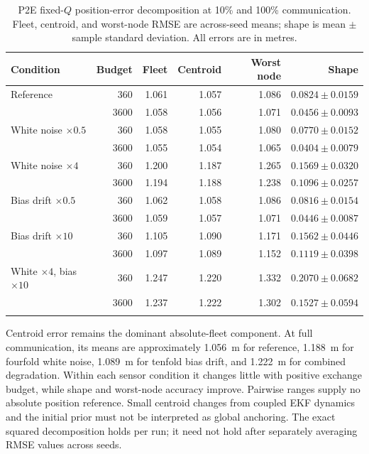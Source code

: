 \begin{table}[htbp]
\centering\small
\setlength{\tabcolsep}{4pt}
\caption{P2E fixed-\(Q\) position-error decomposition at 10\% and 100\% communication. Fleet, centroid, and worst-node RMSE are across-seed means; shape is mean \(\pm\) sample standard deviation. All errors are in metres.}
\label{tab:p2e_decomposition}
\begin{tabular}{lrrrrr}
\toprule
Condition & Budget & Fleet & Centroid & Worst node & Shape \\
\midrule
Reference & 360 & 1.061 & 1.057 & 1.086 & \(0.0824\pm0.0159\) \\
 & 3600 & 1.058 & 1.056 & 1.071 & \(0.0456\pm0.0093\) \\
\addlinespace
White noise $\times0.5$ & 360 & 1.058 & 1.055 & 1.080 & \(0.0770\pm0.0152\) \\
 & 3600 & 1.055 & 1.054 & 1.065 & \(0.0404\pm0.0079\) \\
\addlinespace
White noise $\times4$ & 360 & 1.200 & 1.187 & 1.265 & \(0.1569\pm0.0320\) \\
 & 3600 & 1.194 & 1.188 & 1.238 & \(0.1096\pm0.0257\) \\
\addlinespace
Bias drift $\times0.5$ & 360 & 1.062 & 1.058 & 1.086 & \(0.0816\pm0.0154\) \\
 & 3600 & 1.059 & 1.057 & 1.071 & \(0.0446\pm0.0087\) \\
\addlinespace
Bias drift $\times10$ & 360 & 1.105 & 1.090 & 1.171 & \(0.1562\pm0.0446\) \\
 & 3600 & 1.097 & 1.089 & 1.152 & \(0.1119\pm0.0398\) \\
\addlinespace
White $\times4$, bias $\times10$ & 360 & 1.247 & 1.220 & 1.332 & \(0.2070\pm0.0682\) \\
 & 3600 & 1.237 & 1.222 & 1.302 & \(0.1527\pm0.0594\) \\
\addlinespace
\bottomrule
\end{tabular}
\end{table}

Centroid error remains the dominant absolute-fleet component. At full communication, its means are approximately \SI{1.056}{m} for reference, \SI{1.188}{m} for fourfold white noise, \SI{1.089}{m} for tenfold bias drift, and \SI{1.222}{m} for combined degradation. Within each sensor condition it changes little with positive exchange budget, while shape and worst-node accuracy improve. Pairwise ranges supply no absolute position reference. Small centroid changes from coupled EKF dynamics and the initial prior must not be interpreted as global anchoring. The exact squared decomposition holds per run; it need not hold after separately averaging RMSE values across seeds.

